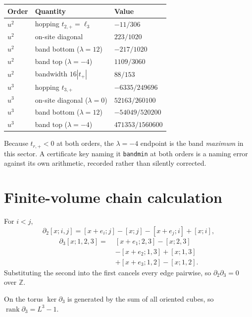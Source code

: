 \documentclass[11pt]{article}
\theoremstyle{plain}
\theoremstyle{definition}
\theoremstyle{remark}
\newcommand{\chk}[1]{}
\begin{document}
\begin{center}
\begin{tabular}{@{}lll@{}}
\toprule
Order & Quantity & Value\\
\midrule
$u^2$ & hopping $t_{2,+}=\ell_3$ & $-11/306$\\
$u^2$ & on-site diagonal & $223/1020$\\
$u^2$ & band bottom ($\lambda=12$) & $-217/1020$\\
$u^2$ & band top ($\lambda=-4$) & $1109/3060$\\
$u^2$ & bandwidth $16|t_+|$ & $88/153$\\
$u^3$ & hopping $t_{3,+}$ & $-6335/249696$\\
$u^3$ & on-site diagonal ($\lambda=0$) & $52163/260100$\\
$u^3$ & band bottom ($\lambda=12$) & $-54049/520200$\\
$u^3$ & band top ($\lambda=-4$) & $471353/1560600$\\
\bottomrule
\end{tabular}
\end{center}

\chk{one assembly formula gives every C-even value at both orders}

Because $t_{r,+}<0$ at both orders, the $\lambda=-4$ endpoint is the band
\emph{maximum} in this sector. A certificate key naming it \texttt{bandmin} at
both orders is a naming error against its own arithmetic, recorded rather than
silently corrected.
\chk{FINDING: the certificate key 'bandmin' holds the band MAXIMUM, at both orders}

\section{Finite-volume chain calculation}\label{app:chain}

For $i<j$,
\[
  \partial_2[x;i,j]=[x+e_i;j]-[x;j]-[x+e_j;i]+[x;i],
\]
\begin{align*}
  \partial_3[x;1,2,3]=\;&[x+e_1;2,3]-[x;2,3]\\
  &-[x+e_2;1,3]+[x;1,3]\\
  &+[x+e_3;1,2]-[x;1,2].
\end{align*}
Substituting the second into the first cancels every edge pairwise, so
$\partial_2\partial_3=0$ over $\mathbb Z$.
\chk{d\_2 d\_3 = 0 on the built complex}
On the torus $\ker\partial_3$ is generated by the sum of all oriented cubes,
so $\operatorname{rank}\partial_3=L^3-1$.
\chk{rank d\_3 = L\^{}3 - 1 on the built complex}
\end{document}
